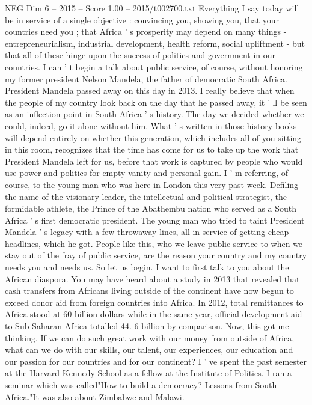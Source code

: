 \begin{textsample}{NEG Dim 6 – 2015 – Score 1.00 – 2015/t002700.txt}
Everything I say today will be in service of a single objective : convincing you, showing you, that your countries need you ; that Africa ' s prosperity may depend on many things - entrepreneurialism, industrial development, health reform, social upliftment - but that all of these hinge upon the success of politics and government in our countries.
I can ' t begin a talk about public service, of course, without honoring my former president Nelson Mandela, the father of democratic South Africa.
President Mandela passed away on this day in 2013.
I really believe that when the people of my country look back on the day that he passed away, it ' ll be seen as an inflection point in South Africa ' s history.
The day we decided whether we could, indeed, go it alone without him.
What ' s written in those history books will depend entirely on whether this generation, which includes all of you sitting in this room, recognizes that the time has come for us to take up the work that President Mandela left for us, before that work is captured by people who would use power and politics for empty vanity and personal gain.
I ' m referring, of course, to the young man who was here in London this very past week.
Defiling the name of the visionary leader, the intellectual and political strategist, the formidable athlete, the Prince of the Abathembu nation who served as a South Africa ' s first democratic president.
The young man who tried to taint President Mandela ' s legacy with a few throwaway lines, all in service of getting cheap headlines, which he got.
People like this, who we leave public service to when we stay out of the fray of public service, are the reason your country and my country needs you and needs us.
So let us begin.
I want to first talk to you about the African diaspora.
You may have heard about a study in 2013 that revealed that cash transfers from Africans living outside of the continent have now begun to exceed donor aid from foreign countries into Africa.
In 2012, total remittances to Africa stood at 60 billion dollars while in the same year, official development aid to Sub-Saharan Africa totalled 44. 6 billion by comparison.
Now, this got me thinking.
If we can do such great work with our money from outside of Africa, what can we do with our skills, our talent, our experiences, our education and our passion for our countries and for our continent?
I ' ve spent the past semester at the Harvard Kennedy School as a fellow at the Institute of Politics.
I ran a seminar which was called"How to build a democracy?
Lessons from South Africa."It was also about Zimbabwe and Malawi.

\end{textsample}
